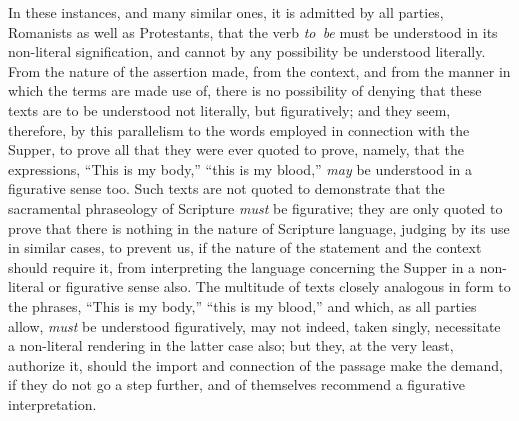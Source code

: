 \documentclass[
  english,
]{book}
\begin{document}
In these instances, and many similar ones, it is admitted by all parties, Romanists as well as Protestants, that the verb \emph{to~be} must be understood in its non-literal signification, and cannot by any possibility be understood literally. From the nature of the assertion made, from the context, and from the manner in which the terms are made use of, there is no possibility of denying that these texts are to be understood not literally, but figuratively; and they seem, therefore, by this parallelism to the words employed in connection with the Supper, to prove all that they were ever quoted to prove, namely, that the expressions, ``This is my body,'' ``this is my blood,'' \emph{may} be understood in a figurative sense too. Such texts are not quoted to demonstrate that the sacramental phraseology of Scripture \emph{must} be figurative; they are only quoted to prove that there is nothing in the nature of Scripture language, judging by its use in similar cases, to prevent us, if the nature of the statement and the context should require it, from interpreting the language concerning the Supper in a non-literal or figurative sense also. The multitude of texts closely analogous in form to the phrases, ``This is my body,'' ``this is my blood,'' and which, as all parties allow, \emph{must} be understood figuratively, may not indeed, taken singly, necessitate a non-literal rendering in the latter case also; but they, at the very least, authorize it, should the import and connection of the passage make the demand, if they do not go a step further, and of themselves recommend a figurative interpretation.
\end{document}
